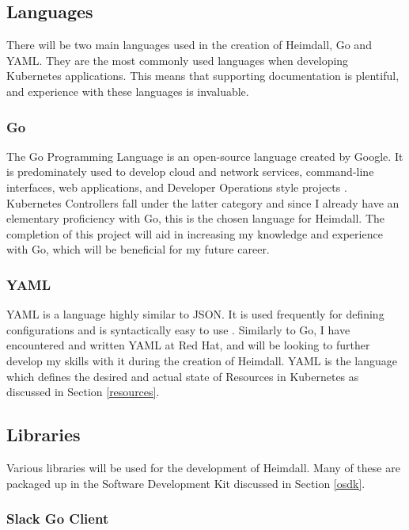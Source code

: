 \documentclass{article}
\begin{document}
\subsection{Languages}
There will be two main languages used in the creation of Heimdall, Go and YAML. They are the most commonly used languages when developing Kubernetes applications. This means that supporting documentation is plentiful, and experience with these languages is invaluable.  

\subsubsection{Go}

The Go Programming Language is an open-source language created by Google. It is predominately used to develop cloud and network services, command-line interfaces, web applications, and Developer Operations style projects \cite{go-dev}. Kubernetes Controllers fall under the latter category and since I already have an elementary proficiency with Go, this is the chosen language for Heimdall. The completion of this project will aid in increasing my knowledge and experience with Go, which will be beneficial for my future career.

\subsubsection{YAML}

YAML is a language highly similar to JSON. It is used frequently for defining configurations and is syntactically easy to use \cite{yaml-blog}. Similarly to Go, I have encountered and written YAML at Red Hat, and will be looking to further develop my skills with it during the creation of Heimdall. YAML is the language which defines the desired and actual state of Resources in Kubernetes as discussed in Section \ref{resources}. 

\subsection{Libraries}

Various libraries will be used for the development of Heimdall. Many of these are packaged up in the Software Development Kit discussed in Section \ref{osdk}. 


\subsubsection{Slack Go Client}
\end{document}
